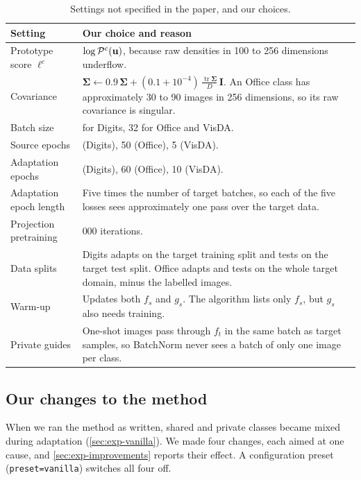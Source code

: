 \begin{table}[t]
  \centering
  \small
  \caption{Settings not specified in the paper, and our choices.}
  \label{tab:choices}
  \begin{tabularx}{\columnwidth}{@{}>{\raggedright\arraybackslash}p{2.0cm}>{\raggedright\arraybackslash}X@{}}
    \toprule
    Setting & Our choice and reason \\
    \midrule
    Prototype score $\ell^c$ & $\log\mathcal{P}^c(\mathbf{u})$, because raw densities in 100 to 256 dimensions underflow. \\
    Covariance & $\bm{\Sigma}\leftarrow 0.9\,\bm{\Sigma} + (0.1+10^{-4})\,\tfrac{\operatorname{tr}\bm{\Sigma}}{D}\,\mathbf{I}$. An Office class has approximately 30 to 90 images in 256 dimensions, so its raw covariance is singular. \\
    Batch size & 64 for Digits, 32 for Office and VisDA. \\
    Source epochs & 10 (Digits), 50 (Office), 5 (VisDA). \\
    Adaptation epochs & 30 (Digits), 60 (Office), 10 (VisDA). \\
    Adaptation epoch length & Five times the number of target batches, so each of the five losses sees approximately one pass over the target data. \\
    Projection pretraining & 2{,}000 iterations. \\
    Data splits & Digits adapts on the target training split and tests on the target test split. Office adapts and tests on the whole target domain, minus the labelled images. \\
    Warm-up & Updates both $f_s$ and $g_s$. The algorithm lists only $f_s$, but $g_s$ also needs training. \\
    Private guides & One-shot images pass through $f_t$ in the same batch as target samples, so BatchNorm never sees a batch of only one image per class. \\
    \bottomrule
  \end{tabularx}
\end{table}

\subsection{Our changes to the method}\label{sec:changes}
When we ran the method as written, shared and private classes became mixed during adaptation (\cref{sec:exp-vanilla}).
We made four changes, each aimed at one cause, and \cref{sec:exp-improvements} reports their effect.
A configuration preset (\texttt{preset=vanilla}) switches all four off.

